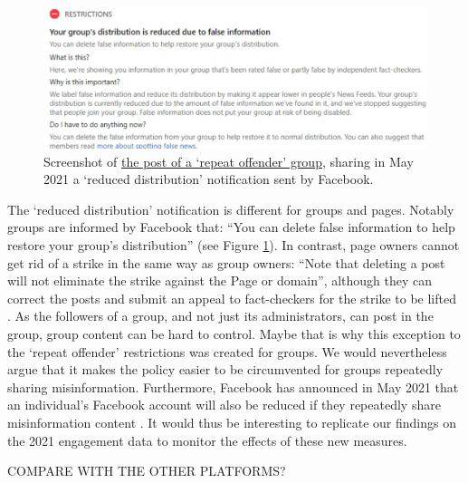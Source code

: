 \documentclass[review]{elsarticle}
\begin{document}
{\begin{figure}[!h]
\centering
\includegraphics[scale=0.24]{./../figure/screenshot_reduced_group.png}
\caption{
Screenshot of \href{https://www.facebook.com/groups/mcbowwow/posts/3893068180741848/}{the post of a `repeat offender' group}, sharing in May 2021 a `reduced distribution' notification sent by Facebook.
}
\label{screenshot_reduced_group}
\end{figure}

The `reduced distribution' notification is different for groups and pages. 
Notably groups are informed by Facebook that: ``You can delete false information to help restore your group's distribution'' (see Figure \ref{screenshot_reduced_group}).
In contrast, page owners cannot get rid of a strike in the same way as group owners: ``Note that deleting a post will not eliminate the strike against the Page or domain'', although they can correct the posts and submit an appeal to fact-checkers for the strike to be lifted \cite{FacebookCorrectRating}.
As the followers of a group, and not just its administrators, can post in the group, group content can be hard to control. 
Maybe that is why this exception to the `repeat offender' restrictions was created for groups. 
We would nevertheless argue that it makes the policy easier to be circumvented for groups repeatedly sharing misinformation.
Furthermore, Facebook has announced in May 2021 that an individual's Facebook account will also be reduced if they repeatedly share misinformation content \cite{FacebookReduceUsers}.
It would thus be interesting to replicate our findings on the 2021 engagement data to monitor the effects of these new measures.

{\color{red} COMPARE WITH THE OTHER PLATFORMS?}

}
\end{document}
